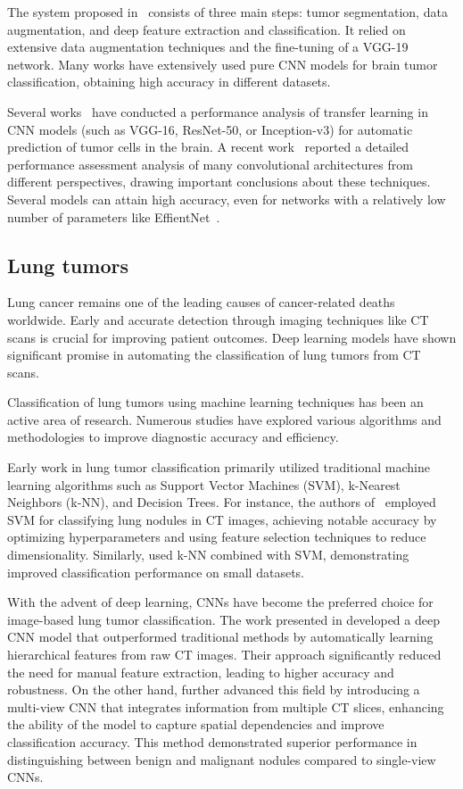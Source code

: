 The system proposed in~\cite{sajjad2019multi} consists of three main steps: tumor segmentation, data augmentation, and deep feature extraction and classification. It relied on extensive data augmentation techniques and the fine-tuning of a VGG-19 network. Many works \cite{ayadi2021deep} have extensively used pure CNN models for brain tumor classification, obtaining high accuracy in different datasets. 

Several works~\cite{srinivas2022deep} have conducted a performance analysis of transfer learning in CNN models (such as VGG-16, ResNet-50, or Inception-v3) for automatic prediction of tumor cells in the brain. A recent work~\cite{reyes2024performance} reported a detailed performance assessment analysis of many convolutional architectures from different perspectives, drawing important conclusions about these techniques. Several models can attain high accuracy, even for networks with a relatively low number of parameters like EffientNet~\cite{medina2023high}. 

\subsection{Lung tumors}
    
Lung cancer remains one of the leading causes of cancer-related deaths worldwide. Early and accurate detection through imaging techniques like CT scans is crucial for improving patient outcomes. Deep learning models have shown significant promise in automating the classification of lung tumors from CT scans. 

Classification of lung tumors using machine learning techniques has been an active area of research. Numerous studies have explored various algorithms and methodologies to improve diagnostic accuracy and efficiency. 

Early work in lung tumor classification primarily utilized traditional machine learning algorithms such as Support Vector Machines (SVM), k-Nearest Neighbors (k-NN), and Decision Trees. For instance, the authors of~\cite{7158331} employed SVM for classifying lung nodules in CT images, achieving notable accuracy by optimizing hyperparameters and using feature selection techniques to reduce dimensionality. Similarly, \cite{sathishkumar2019detection} used k-NN combined with SVM, demonstrating improved classification performance on small datasets.

With the advent of deep learning, CNNs have become the preferred choice for image-based lung tumor classification. The work presented in \cite{shen15} developed a deep CNN model that outperformed traditional methods by automatically learning hierarchical features from raw CT images. Their approach significantly reduced the need for manual feature extraction, leading to higher accuracy and robustness. On the other hand, \cite{LIU2018262} further advanced this field by introducing a multi-view CNN that integrates information from multiple CT slices, enhancing the ability of the model to capture spatial dependencies and improve classification accuracy. This method demonstrated superior performance in distinguishing between benign and malignant nodules compared to single-view CNNs.

